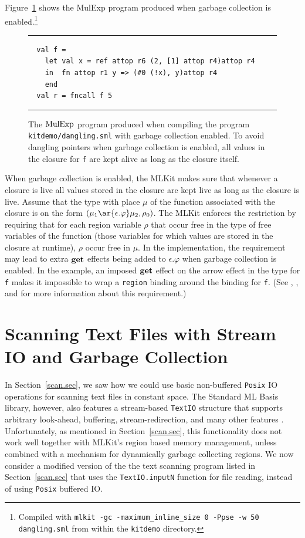 \documentclass[12pt]{book}
\begin{document}
Figure~\ref{dangling_gc.fig} shows the MulExp program produced when
garbage collection is enabled.\footnote{Compiled with {\tt mlkit -gc
    -maximum\_inline\_size 0 -Ppse -w 50 dangling.sml} from within the
  {\tt kitdemo} directory.}
\begin{figure}[ht]
\hrule \medskip
\begin{verbatim}
  val f =
    let val x = ref attop r6 (2, [1] attop r4)attop r4
    in  fn attop r1 y => (#0 (!x), y)attop r4
    end
  val r = fncall f 5
\end{verbatim}
\caption{The $\hbox{\rm MulExp}$ program produced when compiling the program
  {\tt kitdemo/dangling.sml} with garbage collection enabled. To avoid
  dangling pointers when garbage collection is enabled, all values in
  the closure for {\tt f} are kept alive as long as the closure
  itself.}  \medskip \hrule
\label{dangling_gc.fig}
\end{figure}
When garbage collection is enabled, the MLKit makes sure that whenever
a closure is live all values stored in the closure are kept live as
long as the closure is live.  Assume that the type with place $\mu$ of
the function associated with the closure is on the form $(\mu_1
\ar{\epsilon.\varphi} \mu_2, \rho_0)$.  The MLKit enforces the
restriction by requiring that for each region variable $\rho$ that
occur free in the type of free variables of the function (those
variables for which values are stored in the closure at runtime),
$\rho$ occur free in $\mu$. In the implementation, the requirement may
lead to extra $\mathop{\bf get}\nolimits$ effects being added to $\epsilon.\varphi$ when
garbage collection is enabled. In the example, an imposed $\mathop{\bf get}\nolimits$
effect on the arrow effect in the type for {\tt f} makes it impossible
to wrap a {\tt region} binding around the binding for {\tt f}. (See
\cite[page 50]{total93}, \cite{elsman:tldi03}, and
\cite{gcsafety-revisited-tr-2022} for more information about this
requirement.)

\section{Scanning Text Files with Stream IO and Garbage Collection}

In Section~\ref{scan.sec}, we saw how we could use basic non-buffered
\texttt{Posix} IO operations for scanning text files in constant
space. The Standard ML Basis library, however, also features a
stream-based \texttt{TextIO} structure that supports arbitrary
look-ahead, buffering, stream-redirection, and many other features
\cite{basislib2004}. Unfortunately, as mentioned in
Section~\ref{scan.sec}, this functionality does not work well together
with MLKit's region based memory management, unless combined with a
mechanism for dynamically garbage collecting regions. We now consider
a modified version of the the text scanning program listed in
Section~\ref{scan.sec} that uses the \texttt{TextIO.inputN} function
for file reading, instead of using \texttt{Posix} buffered IO.
\end{document}
